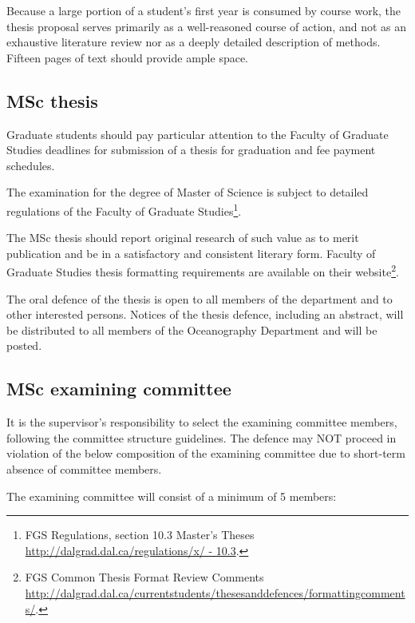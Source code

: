 \documentclass{article}
\newcommand\elink[1]{\url{#1}}
\begin{document}
Because a large portion of a student’s first year is consumed by course work,
the thesis proposal serves primarily as a well-reasoned course of action, and
not as an exhaustive literature review nor as a deeply detailed description of
methods. Fifteen pages of text should provide ample space.


\subsection{MSc thesis}

Graduate students should pay particular attention to the Faculty of Graduate
Studies deadlines for submission of a thesis for graduation and fee payment
schedules.
 
The examination for the degree of Master of Science is subject to detailed
regulations of the Faculty of Graduate Studies\footnote{FGS Regulations,
section 10.3 Master’s Theses \elink{http://dalgrad.dal.ca/regulations/x/ -
10.3}.}.

The MSc thesis should report original research of such value as to merit
publication and be in a satisfactory and consistent literary form. Faculty of
Graduate Studies thesis formatting requirements are available on their
website\footnote{FGS Common Thesis Format Review Comments
\elink{http://dalgrad.dal.ca/currentstudents/thesesanddefences/formattingcomments/}.}.


The oral defence of the thesis is open to all members of the department and to
other interested persons. Notices of the thesis defence, including an abstract,
will be distributed to all members of the Oceanography Department and will be
posted.

\subsection{MSc examining committee}

It is the supervisor’s responsibility to select the examining committee
members, following the committee structure guidelines. The defence may NOT
proceed in violation of the below composition of the examining committee due to
short-term absence of committee members.

The examining committee will consist of a minimum of 5 members:
\end{document}

